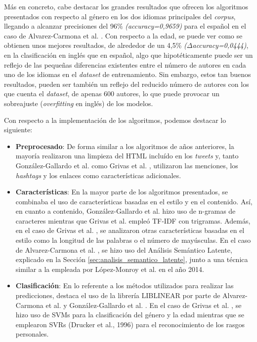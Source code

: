 \bigskip
Más en concreto, cabe destacar los grandes resultados que
ofrecen los algoritmos presentados con respecto al género en los dos idiomas principales del \textit{corpus}, llegando a alcanzar
precisiones del 96\% \textit{(accuracy=0,9659)} para el español en el caso de Alvarez-Carmona et al. \cite{alvarez2015inaoe}. Con respecto a la edad,
se puede ver como se obtienen unos mejores resultados, de alrededor de un 4,5\% \textit{($\Delta$accuracy=0,0444)}, en la clasificación en inglés que en español, algo que
hipotéticamente puede ser un reflejo de las pequeñas diferencias existentes entre el número de autores en cada uno de los idiomas en
el \textit{dataset} de entrenamiento. Sin embargo, estos tan buenos resultados, pueden ser también un reflejo del reducido número de
autores con los que cuenta el \textit{dataset}, de apenas 600 autores, lo que puede provocar un sobreajuste (\textit{overfitting} en inglés)
de los modelos.

\bigskip
Con respecto a la implementación de los algoritmos, podemos destacar lo siguiente:

\begin{itemize}
	\item \textbf{Preprocesado}: De forma similar a los algoritmos de años anteriores, la mayoría realizaron una limpieza del HTML incluído
	      en los \textit{tweets} y, tanto González-Gallardo et al. \cite{gonzalez2015tweets} como Grivas et al. \cite{grivas2015author}, utilizaron
	      las menciones, los \textit{hashtags} y los enlaces como características adicionales.
	\item \textbf{Características}: En la mayor parte de los algoritmos presentados, se combinaba el uso de características
	      basadas en el estilo y en el contenido. Así, en cuanto a contenido, González-Gallardo et al. \cite{gonzalez2015tweets} hizo uso de n-gramas de caracteres
	      mientras que Grivas et al. \cite{grivas2015author} empleó TF-IDF con trigramas. Además, en el caso de Grivas et al. \cite{grivas2015author},
	      se analizaron otras características basadas en el estilo como la longitud de las palabras o el número de mayúsculas. En el caso de Alvarez-Carmona et al. \cite{alvarez2015inaoe},
	      se hizo uso del Análisis Semántico Latente, explicado en la Sección \ref{sec:analisis_semantico_latente}, junto a una técnica similar a la empleada por
	      López-Monroy et al. \cite{lopez2014using} en el año 2014.
	\item \textbf{Clasificación}: En lo referente a los métodos utilizados para realizar las predicciones, destaca el uso de la librería LIBLINEAR \cite{fan2008liblinear}
	      por parte de Alvarez-Carmona et al. \cite{alvarez2015inaoe} y González-Gallardo et al. \cite{gonzalez2015tweets}. En el caso de Grivas et al. \cite{grivas2015author}, se hizo
	      uso de SVMs para la clasificación del género y la edad mientras que se emplearon SVRs (Drucker et al., 1996) \cite{drucker1996support} para el reconocimiento de los rasgos personales.
\end{itemize}

